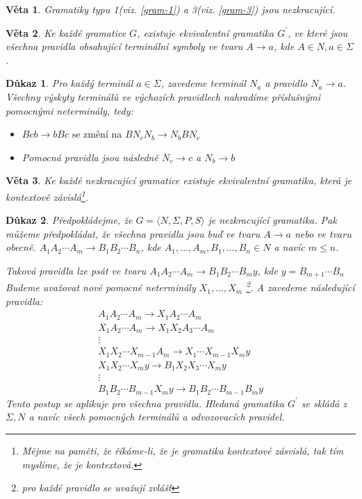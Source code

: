 \documentclass[10pt, a4paper, titlepage]{article}
\theoremstyle{note}
\newtheorem{dukaz}{Důkaz}
\newtheorem{veta}{Věta}
\begin{document}
\begin{veta}
Gramatiky typu 1(viz. \ref{gram-1}) a 3(viz. \ref{gram-3}) jsou nezkracující.
\end{veta}

\begin{veta}
Ke každé gramatice $G$, existuje ekvivalentní gramatika $G^{'}$, ve které
jsou všechna pravidla obsahující terminální symboly ve tvaru $A \rightarrow a$, kde $A \in N, a \in \Sigma$.
\end{veta}

\begin{dukaz}
Pro každý terminál $a \in \Sigma$, zavedeme terminál $N_{a}$ a pravidlo $N_{a} \rightarrow a$.
Všechny výskyty terminálů ve výchozích pravidlech nahradíme příslušnými pomocnými neterminály, tedy:
\begin{itemize}
\item
$Bcb \rightarrow bBc \text{ se změní na } BN_{c}N_{b} \rightarrow N_{b} BN_{c}$

\item
Pomocná pravidla jsou následně $N_{c} \rightarrow c$ a $N_{b} \rightarrow b$
\end{itemize}
\end{dukaz}

\begin{veta}
Ke každé nezkracující gramatice existuje ekvivalentní gramatika, která je kontextově závislá\footnote{Mějme na paměti, že říkáme-li, že je
gramatika kontextové zásvislá, tak tím myslíme, že je kontextová.}.
\end{veta}

\begin{dukaz}
Předpokládejme, že $G = \langle N, \Sigma, P, S \rangle$ je nezkracující gramatika. Pak můžeme předpokládat, 
že všechna pravidla jsou buď ve tvaru $A \rightarrow a$ nebo ve tvaru obecně. 
$A_{1} A_{2} \cdots A_{m} \rightarrow B_{1} B_{2} \cdots B_{n}$, kde $A_{1}, \ldots,A_{m}, B_{1}, \ldots,B_{n} \in N$ a navíc $m \leq n$. 

Taková pravidla lze psát ve tvaru $A_{1} A_{2} \cdots A_{m} \rightarrow B_{1} B_{2} \cdots B_{m}y$, kde $y = B_{m+1} \cdots B_{n}$ 
Budeme uvažovat nové pomocné neterminály $X_{1},...,X_{m}$ \footnote{pro každé pravidlo se uvažují zvlášť}. 
A zavedeme následující pravidla:
\begin{gather*}
A_{1} A_{2} \cdots A_{m} \rightarrow X_{1} A_{2} \cdots A_{m} \\
X_{1} A_{2} \cdots A_{m} \rightarrow X_{1} X_{2} A_{3} \cdots A_{m} \\
\vdots \\
X_{1} X_{2} \cdots X_{m-1} A_{m} \rightarrow X_{1} \cdots X_{m-1} X_{m}y \\
X_{1} X_{2} \cdots X_{m}y \rightarrow B_{1} X_{2} X_{3} \cdots X_{m}y \\
\vdots \\
B_{1} B_{2} \cdots B_{m-1} X_{m}y \rightarrow B_{1} B_{2} \cdots B_{m-1}B_{m}y
\end{gather*}
Tento postup se aplikuje pro všechna pravidla. Hledaná gramatika $G^{'}$ se skládá
z $\Sigma, N$ a navíc všech pomocných terminálů a odvozovacích pravidel.
\end{dukaz}
\end{document}
